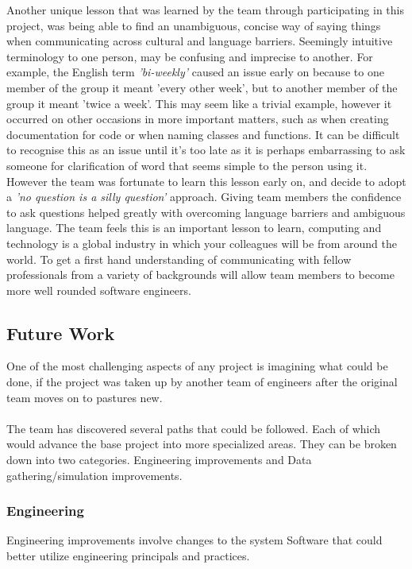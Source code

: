 \documentclass[11pt]{article}
\begin{document}
\begin{enumerate}
	Another unique lesson that was learned by the team through participating in this project, was being able to find an unambiguous, concise way of saying things when communicating across cultural and language barriers. Seemingly intuitive terminology to one person, may be confusing and imprecise to another. For example, the English term \textit{'bi-weekly'} caused an issue early on because to one member of the group it meant 'every other week', but to another member of the group it meant 'twice a week'. This may seem like a trivial example, however it occurred on other occasions in more important matters, such as when creating documentation for code or when naming classes and functions. It can be difficult to recognise this as an issue until it's too late as it is perhaps embarrassing to ask someone for clarification of word that seems simple to the person using it. However the team was fortunate to learn this lesson early on, and decide to adopt a \textit{'no question is a silly question'} approach. Giving team members the confidence to ask questions helped greatly with overcoming language barriers and ambiguous language. The team feels this is an important lesson to learn, computing and technology is a global industry in which your colleagues will be from around the world. To get a first hand understanding of communicating with fellow professionals from a variety of backgrounds will allow team members to become more well rounded software engineers.
	
\pagebreak
\subsection{Future Work} 
One of the most challenging aspects of any project is imagining what could be done, if the project was taken up by another team of engineers after the original team moves on to pastures new.
\\~\\
The team has discovered several paths that could be followed. Each of which would advance the base project into more specialized areas.
They can be broken down into two categories. Engineering improvements and Data gathering/simulation improvements.

\subsubsection{Engineering}
Engineering improvements involve changes to the system Software that could better utilize engineering principals and practices.


\end{enumerate}
\end{document}
